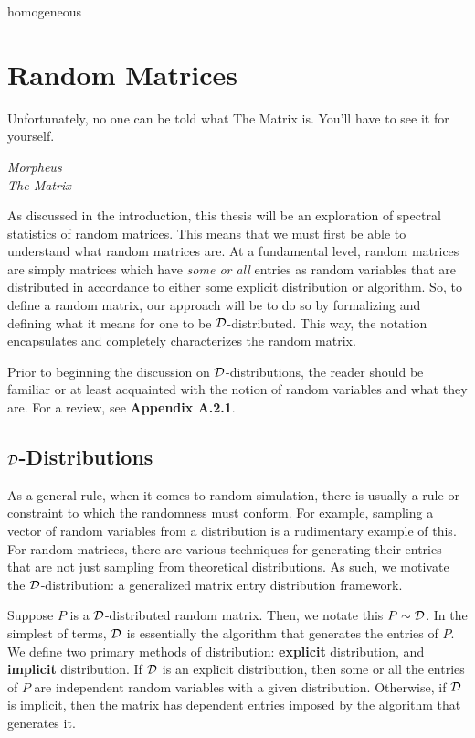 homogeneous
\chapter{Random Matrices}

\epigraph{Unfortunately, no one can be told what The Matrix is. You'll have to see it for yourself.}{\textit{Morpheus \\ The Matrix}}

As discussed in the introduction, this thesis will be an exploration of spectral statistics of random matrices. This means that we must first be able to understand what random matrices are.
At a fundamental level, random matrices are simply matrices which have \textit{some or all} entries as random variables that are distributed in accordance to either some explicit distribution or algorithm.
So, to define a random matrix, our approach will be to do so by formalizing and defining what it means for one to be $\D$-distributed.
This way, the notation encapsulates and completely characterizes the random matrix.

Prior to beginning the discussion on $\D$-distributions, the reader should be familiar or at least acquainted with the notion of random variables and what they are.
For a review, see \textbf{Appendix A.2.1}.


\section{$\D$-Distributions}

As a general rule, when it comes to random simulation, there is usually a rule or constraint to which the randomness must conform.
For example, sampling a vector of random variables from a distribution is a rudimentary example of this.
For random matrices, there are various techniques for generating their entries that are not just sampling from theoretical distributions.
As such, we motivate the $\D$-distribution: a generalized matrix entry distribution framework.

\begin{definition}[$\D$-distribution]
Suppose $P$ is a $\D$-distributed random matrix. Then, we notate this $P \sim \mathcal{D}$. In the simplest of terms, $\D$ is essentially the algorithm that generates the entries of $P$.
We define two primary methods of distribution: \textbf{explicit} distribution, and \textbf{implicit} distribution.
If $\D$ is an explicit distribution, then some or all the entries of $P$ are independent random variables with a given distribution.
Otherwise, if $\D$ is implicit, then the matrix has dependent entries imposed by the algorithm that generates it.
\end{definition}

